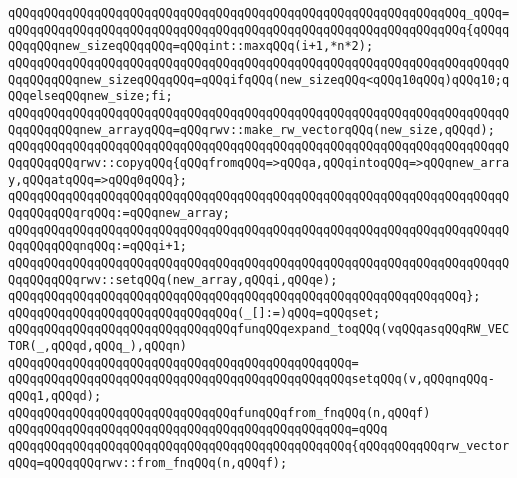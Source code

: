 \verb|qQQqqQQqqQQqqQQqqQQqqQQqqQQqqQQqqQQqqQQqqQQqqQQqqQQqqQQqqQQqqQQq_qQQq=|\newline
\verb|qQQqqQQqqQQqqQQqqQQqqQQqqQQqqQQqqQQqqQQqqQQqqQQqqQQqqQQqqQQqqQQq{qQQqqQQqqQQqnew_sizeqQQqqQQq=qQQqint::maxqQQq(i+1,*n*2);|\newline
\verb|qQQqqQQqqQQqqQQqqQQqqQQqqQQqqQQqqQQqqQQqqQQqqQQqqQQqqQQqqQQqqQQqqQQqqQQqqQQqqQQqnew_sizeqQQqqQQq=qQQqifqQQq(new_sizeqQQq<qQQq10qQQq)qQQq10;qQQqelseqQQqnew_size;fi;|\newline
\verb|qQQqqQQqqQQqqQQqqQQqqQQqqQQqqQQqqQQqqQQqqQQqqQQqqQQqqQQqqQQqqQQqqQQqqQQqqQQqqQQqnew_arrayqQQq=qQQqrwv::make_rw_vectorqQQq(new_size,qQQqd);|\newline
\verb|qQQqqQQqqQQqqQQqqQQqqQQqqQQqqQQqqQQqqQQqqQQqqQQqqQQqqQQqqQQqqQQqqQQqqQQqqQQqqQQqrwv::copyqQQq{qQQqfromqQQq=>qQQqa,qQQqintoqQQq=>qQQqnew_array,qQQqatqQQq=>qQQq0qQQq};|\newline
\verb|qQQqqQQqqQQqqQQqqQQqqQQqqQQqqQQqqQQqqQQqqQQqqQQqqQQqqQQqqQQqqQQqqQQqqQQqqQQqqQQqrqQQq:=qQQqnew_array;|\newline
\verb|qQQqqQQqqQQqqQQqqQQqqQQqqQQqqQQqqQQqqQQqqQQqqQQqqQQqqQQqqQQqqQQqqQQqqQQqqQQqqQQqnqQQq:=qQQqi+1;|\newline
\verb|qQQqqQQqqQQqqQQqqQQqqQQqqQQqqQQqqQQqqQQqqQQqqQQqqQQqqQQqqQQqqQQqqQQqqQQqqQQqqQQqrwv::setqQQq(new_array,qQQqi,qQQqe);|\newline
\verb|qQQqqQQqqQQqqQQqqQQqqQQqqQQqqQQqqQQqqQQqqQQqqQQqqQQqqQQqqQQqqQQq};|\newline
\newline
\newline
\verb|qQQqqQQqqQQqqQQqqQQqqQQqqQQqqQQq(_[]:=)qQQq=qQQqset;|\newline
\newline
\verb|qQQqqQQqqQQqqQQqqQQqqQQqqQQqqQQqfunqQQqexpand_toqQQq(vqQQqasqQQqRW_VECTOR(_,qQQqd,qQQq_),qQQqn)|\newline
\verb|qQQqqQQqqQQqqQQqqQQqqQQqqQQqqQQqqQQqqQQqqQQqqQQq=|\newline
\verb|qQQqqQQqqQQqqQQqqQQqqQQqqQQqqQQqqQQqqQQqqQQqqQQqsetqQQq(v,qQQqnqQQq-qQQq1,qQQqd);|\newline
\newline
\newline
\verb|qQQqqQQqqQQqqQQqqQQqqQQqqQQqqQQqfunqQQqfrom_fnqQQq(n,qQQqf)|\newline
\verb|qQQqqQQqqQQqqQQqqQQqqQQqqQQqqQQqqQQqqQQqqQQqqQQq=qQQq|\newline
\verb|qQQqqQQqqQQqqQQqqQQqqQQqqQQqqQQqqQQqqQQqqQQqqQQq{qQQqqQQqqQQqrw_vectorqQQq=qQQqqQQqrwv::from_fnqQQq(n,qQQqf);|\newline
